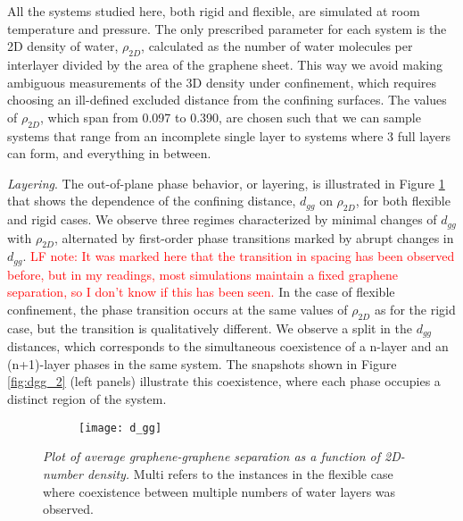 \documentclass[12pt]{article}
\begin{document}
All the systems studied here, both rigid and flexible, are simulated at room temperature and pressure. The only prescribed parameter for each system is the 2D density of water, \(\rho_{2D}\), calculated as the number of water molecules per interlayer divided by the area of the graphene sheet. This way we avoid making ambiguous measurements of the 3D density under confinement, which requires choosing an ill-defined excluded distance from the confining surfaces. The values of \(\rho_{2D}\), which span from 0.097 to 0.390, are chosen such that we can sample systems that range from an incomplete single layer to systems where 3 full layers can form, and everything in between.

\textit{Layering}. The out-of-plane phase behavior, or layering, is illustrated in Figure \ref{fig:dgg_1} that shows the dependence of the confining distance, \(d_{gg}\) on \(\rho_{2D}\), for both flexible and rigid cases. We observe three regimes characterized by minimal changes of \(d_{gg}\) with \(\rho_{2D}\), alternated by first-order phase transitions marked by abrupt changes in \(d_{gg}\). \textcolor{red}{LF note: It was marked here that the transition in spacing has been observed before, but in my readings, most simulations maintain a fixed graphene separation, so I don't know if this has been seen.} In the case of flexible confinement, the phase transition occurs at the same values of \(\rho_{2D}\) as for the rigid case, but the transition is qualitatively different. We observe a split in the \(d_{gg}\) distances, which corresponds to the simultaneous coexistence of a n-layer and an (n+1)-layer phases in the same system. The snapshots shown in Figure \ref{fig:dgg_2} (left panels) illustrate this coexistence, where each phase occupies a distinct region of the system.

\begin{figure}[ht!]
	\centering
	\begin{subfigure}[b]{0.39\textwidth}
    		\texttt{[image: d\_gg]}
  	\end{subfigure}
	\caption{\textit{Plot of average graphene-graphene separation as a function of 2D-number density.} Multi refers to the instances in the flexible case where coexistence between multiple numbers of water layers was observed.}
	\label{fig:dgg_1}
\end{figure}
\end{document}
